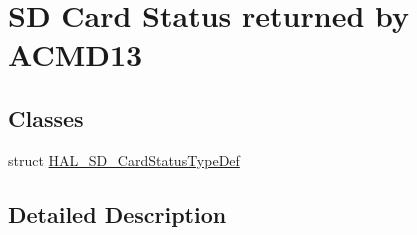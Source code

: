 \hypertarget{group___s_d___exported___types___group6}{}\section{SD Card Status returned by A\+C\+M\+D13}
\label{group___s_d___exported___types___group6}
\subsection*{Classes}
\begin{DoxyCompactItemize}
\item 
struct \mbox{\hyperlink{struct_h_a_l___s_d___card_status_type_def}{H\+A\+L\+\_\+\+S\+D\+\_\+\+Card\+Status\+Type\+Def}}
\end{DoxyCompactItemize}


\subsection{Detailed Description}
